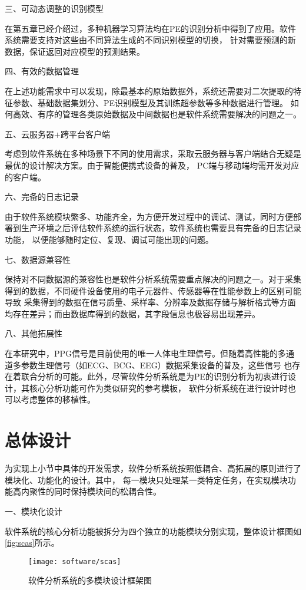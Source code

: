 三、可动态调整的识别模型

在第五章已经介绍过，多种机器学习算法均在PE的识别分析中得到了应用。软件系统需要支持对这些由不同算法生成的不同识别模型的切换，
针对需要预测的新数据，保证返回对应模型的预测结果。

四、有效的数据管理

在上述功能需求中可以发现，除最基本的原始数据外，系统还需要对二次提取的特征参数、基础数据集划分、PE识别模型及其训练超参数等多种数据进行管理。
如何高效、有序的管理各类原始数据及中间数据也是软件系统需要解决的问题之一。

五、云服务器+跨平台客户端

考虑到软件系统在多种场景下不同的使用需求，采取云服务器与客户端结合无疑是最优的设计解决方案。由于智能便携式设备的普及，
PC端与移动端均需开发对应的客户端。

六、完备的日志记录

由于软件系统模块繁多、功能齐全，为方便开发过程中的调试、测试，同时方便部署到生产环境之后评估软件系统的运行状态，软件系统也需要具有完备的日志记录功能，
以便能够随时定位、复现、调试可能出现的问题。

七、数据源兼容性

保持对不同数据源的兼容性也是软件分析系统需要重点解决的问题之一。对于采集得到的数据，不同硬件设备使用的电子元器件、传感器等在性能参数上的区别可能导致
采集得到的数据在信号质量、采样率、分辨率及数据存储与解析格式等方面均存在差异；而由数据库得到的数据，其字段信息也极容易出现差异。

八、其他拓展性

在本研究中，PPG信号是目前使用的唯一人体电生理信号。但随着高性能的多通道多参数生理信号（如ECG、BCG、EEG）数据采集设备的普及，这些信号
也存在着联合分析的可能\cite{Chen2021,Kachuee2015,LMX2019}。此外，尽管软件分析系统是为PE的识别分析为初衷进行设计，其核心分析功能可作为类似研究的参考模板，
软件分析系统在进行设计时也可以考虑整体的移植性。

\section{总体设计}

为实现上小节中具体的开发需求，软件分析系统按照低耦合、高拓展的原则进行了模块化、功能化的设计。其中，
每一模块只处理某一类特定任务，在实现模块功能高内聚性的同时保持模块间的松耦合性。

一、模块化设计

软件系统的核心分析功能被拆分为四个独立的功能模块分别实现，整体设计框图如\autoref{fig:scas}所示。
\begin{figure}[htbp]
    \centering
    \texttt{[image: software/scas]}
    \caption{\label{fig:scas}软件分析系统的多模块设计框架图}
\end{figure}

